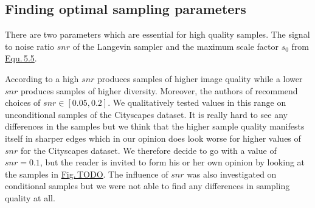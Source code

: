 \subsection{Finding optimal sampling parameters} \label{sec:5.4.4}

There are two parameters which are essential for high quality samples. The signal to noise ratio $snr$ of the Langevin sampler and the maximum scale factor $s_0$ from \hyperref[equ:5.5]{Equ.\,5.5}. 

According to \cite{score_1} a high $snr$ produces samples of higher image quality while a lower $snr$ produces samples of higher diversity. Moreover, the authors of \cite{score_1} recommend choices of $snr\in[0.05,0.2]$. We qualitatively tested values in this range on unconditional samples of the Cityscapes dataset. It is really hard to see any differences in the samples but we think that the higher sample quality manifests itself in sharper edges which in our opinion does look worse for higher values of $snr$ for the Cityscapes dataset. We therefore decide to go with a value of $snr=0.1$, but the reader is invited to form his or her own opinion by looking at the samples in \hyperref[fig:]{Fig.\,TODO}. The influence of $snr$ was also investigated on conditional samples but we were not able to find any differences in sampling quality at all.
%
